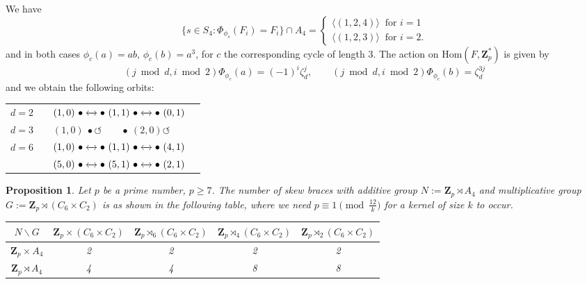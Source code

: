 \documentclass[12pt]{article}
\newtheorem{proposition}[theorem]{Proposition}
\theoremstyle{definition}
\newcommand{\Z}{\mathbf Z}
\newcommand{\Hom}{\mathrm{Hom}}
\begin{document}
We have 
$$
 \{s\in S_4 : \Phi_{\phi_s} (F_i)=F_i\}\cap A_4=
\left\{
\begin{array}{l}
\langle (1,2,4)\rangle\  \mbox{ for }  i=1\\
\langle  (1,2,3)\rangle\ \mbox{ for }  i=2.
\end{array}\right.
$$
and in both cases 
$\phi_c(a)=ab$, $\phi_c(b)=a^3$, for $c$ the corresponding cycle of length 3. The action on $\Hom(F,\Z_p^*)$ is given by
$$
(j \bmod d, i\bmod 2)\Phi_{\phi_{c}}(a)=(-1)^i\zeta_d^{j},
\qquad (j \bmod d, i\bmod 2)\Phi_{\phi_c}(b)=\zeta_d^{3j}
$$
and we obtain the following orbits:
\begin{center}
	\begin{tabular}{lll l }
		$d=2$ &  & $(1,0)\ \bullet \xleftrightarrow{} \bullet\  (1,1)\ \bullet \xleftrightarrow{} \bullet\   (0,1)$ \\[1ex]
		$d=3$& &  $(1,0)\ \bullet \circlearrowleft \qquad \bullet\ (2,0) \circlearrowleft$ \\[1ex]
		$d=6$ & & $(1,0)\ \bullet \xleftrightarrow{}\bullet\   (1,1)\ \bullet \xleftrightarrow{}\bullet\   (4,1)$  \\[1ex]
		& &  $(5,0)\ \bullet \xleftrightarrow{}\bullet\   (5,1)\ \bullet \xleftrightarrow{}\bullet\   (2,1)$
	\end{tabular}
\end{center}

\begin{proposition}
	Let $p$ be a prime number, $p\geq 7$. The number of skew braces with additive group $N:=\Z_p \rtimes A_4$ and multiplicative group $G:=\Z_p\rtimes (C_6\times C_2)$ is as shown in the following table,  where we need $p\equiv 1 \pmod{\frac {12}k}$ for a kernel of size $k$ to occur.
	
	\begin{center}
		\begin{tabular}{|c||c|c|c|c|}
			\hline
			$N \backslash G$ & $\Z_p\times (C_6\times C_2)$ & $\Z_p\rtimes_{6} (C_6\times C_2)$ & $\Z_p\rtimes_{4} (C_6\times C_2)$ & $\Z_p\rtimes_{2} (C_6\times C_2)$ \\
			\hline
			\hline
			$\Z_p \times A_4$ &2&2&2&2\\
			\hline
			$\Z_p \rtimes A_4$ &4&4&8&8\\
			\hline
			
		\end{tabular}
	\end{center}
\end{proposition}
\end{document}

